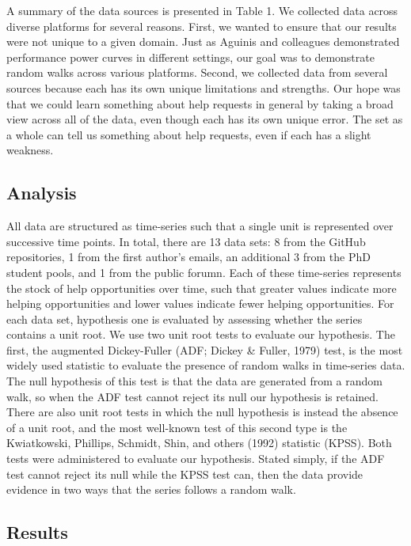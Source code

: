 \documentclass[english,,man]{apa6}
\theoremstyle{definition}
\theoremstyle{definition}
\theoremstyle{definition}
\theoremstyle{remark}
\begin{document}
A summary of the data sources is presented in Table 1. We collected data
across diverse platforms for several reasons. First, we wanted to ensure
that our results were not unique to a given domain. Just as Aguinis and
colleagues demonstrated performance power curves in different settings,
our goal was to demonstrate random walks across various platforms.
Second, we collected data from several sources because each has its own
unique limitations and strengths. Our hope was that we could learn
something about help requests in general by taking a broad view across
all of the data, even though each has its own unique error. The set as a
whole can tell us something about help requests, even if each has a
slight weakness.

\hypertarget{analysis}{%
\subsection{Analysis}\label{analysis}}

All data are structured as time-series such that a single unit is
represented over successive time points. In total, there are 13 data
sets: 8 from the GitHub repositories, 1 from the first author's emails,
an additional 3 from the PhD student pools, and 1 from the public
forumn. Each of these time-series represents the stock of help
opportunities over time, such that greater values indicate more helping
opportunities and lower values indicate fewer helping opportunities. For
each data set, hypothesis one is evaluated by assessing whether the
series contains a unit root. We use two unit root tests to evaluate our
hypothesis. The first, the augmented Dickey-Fuller (ADF; Dickey \&
Fuller, 1979) test, is the most widely used statistic to evaluate the
presence of random walks in time-series data. The null hypothesis of
this test is that the data are generated from a random walk, so when the
ADF test cannot reject its null our hypothesis is retained. There are
also unit root tests in which the null hypothesis is instead the absence
of a unit root, and the most well-known test of this second type is the
Kwiatkowski, Phillips, Schmidt, Shin, and others (1992) statistic
(KPSS). Both tests were administered to evaluate our hypothesis. Stated
simply, if the ADF test cannot reject its null while the KPSS test can,
then the data provide evidence in two ways that the series follows a
random walk.

\hypertarget{results}{%
\subsection{Results}\label{results}}
\end{document}
